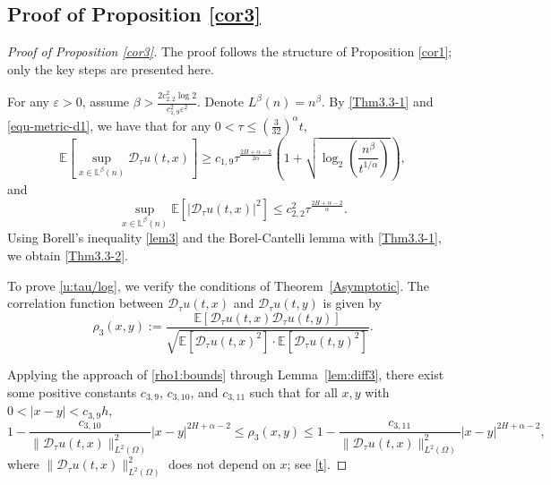 \documentclass[11pt,reqno]{amsart}
\numberwithin{equation}{section}
\def\EE{\mathbb{E}}
\def\bL{\mathbb{L}}
\newcommand{\1}{{\bf 1}}
\newcommand{\2}{{\bf 2}}
\newcommand{\lc}{\left(}
\newcommand{\rc}{\right)}
\begin{document}
\subsection{Proof of  Proposition \ref{cor3}}
\begin{proof}[Proof of  Proposition \ref{cor3}] 
The proof follows the structure of Proposition \ref{cor1}; only the key steps are presented here.

For any $\varepsilon>0$, assume $\beta>\frac{2c_{2,2}^2\log 2}{c_{1,9}^2\varepsilon^2}$. Denote $L^\beta(n)=n^\beta$.
By \eqref{Thm3.3-1} and \eqref{equ-metric-d1}, we have that for any
$0<\tau\leq \left(\frac3{32}\right)^\alpha t$,
 \begin{equation*}
\EE\left[\sup_{x\in\bL^\beta(n)}\mathcal D_{\tau} u(t,x)\right]
\geq c_{1,9}\tau^{\frac{2H+\alpha-2}{2\alpha}}\lc 1+\sqrt{\log_2\lc\frac{n^\beta}{t^{1/\alpha}}\rc}\rc,
 \end{equation*}
and
 \begin{equation*}
\sup_{x\in\bL^\beta(n)}\EE\left[|\mathcal D_{\tau} u (t,x)|^2\right]
     \leq c_{2,2}^2\tau^{\frac{2H+\alpha-2}{\alpha}}.
 \end{equation*}
Using Borell's inequality \eqref{lem3} and the Borel-Cantelli lemma with \eqref{Thm3.3-1}, we obtain \eqref{Thm3.3-2}.

To prove \eqref{u:tau/log}, we   verify the conditions of Theorem~\ref{Asymptotic}.   The correlation function between $\mathcal{D}_{\tau} u(t,x)$ and $\mathcal{D}_{\tau} u(t,y)$ is given by
 $$\rho_3(x,y):=\frac{\mathbb E[\mathcal D_{\tau} u(t,x) \mathcal D_{\tau} u(t,y)]}{ \sqrt{\mathbb E[\mathcal D_{\tau} u(t,x)^2] \cdot \mathbb E[\mathcal D_{\tau} u(t,y)^2] }}.$$

 Applying the approach of \eqref{rho1:bounds} through Lemma~\ref{lem:diff3},   there exist some  positive constants $c_{3,9}$, $c_{3,10}$, and $c_{3,11}$ such that for all $x,y$ with $0 < |x-y| < c_{3,9}h$,
\begin{equation*}
1-\frac{c_{3,10}}{\|\mathcal D_{\tau}u(t,x)\|_{L^2(\Omega)}^2}|x-y|^{2H+\alpha-2}
\leq \rho_3(x,y)\leq
1-\frac{c_{3,11}}{\|\mathcal D_{\tau}u(t,x)\|_{L^2(\Omega)}^2}|x-y|^{2H+\alpha-2},
\end{equation*}
where $\|\mathcal D_{\tau}u(t,x)\|_{L^2(\Omega)}^2$ does not depend on $x$; see \eqref{t}.



\end{proof}
\end{document}

